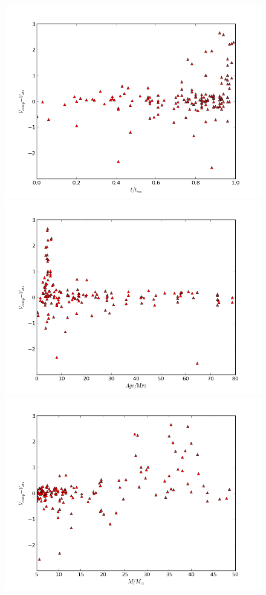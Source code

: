 \documentclass[a4paper,10pt]{article}
\begin{document}
  \begin{figure}[h!]
  \begin{minipage}{0.49\textwidth}
   \includegraphics[width=\textwidth]{diffmagfracms}
  \end{minipage}
  \begin{minipage}{0.49\textwidth}
   \includegraphics[width=\textwidth]{diffmagAge}
  \end{minipage}
  \begin{minipage}{0.49\textwidth}
   \includegraphics[width=\textwidth]{diffmagmass}

\end{minipage}
\end{figure}
\end{document}
